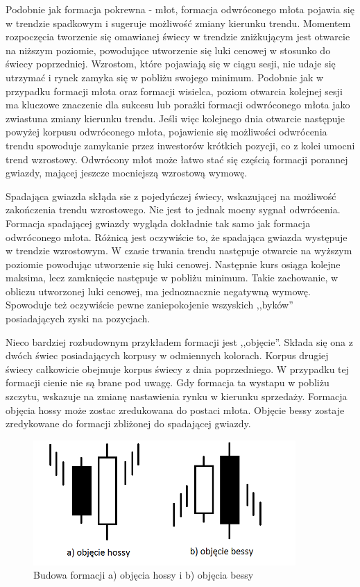 \documentclass[pdflatex,11pt]{aghdpl}
\begin{document}
Podobnie jak formacja pokrewna - młot, formacja odwróconego młota pojawia się w trendzie spadkowym i sugeruje możliwość zmiany kierunku trendu. Momentem rozpoczęcia tworzenie się omawianej świecy w trendzie zniżkującym jest otwarcie na niższym poziomie, powodujące utworzenie się luki cenowej w stosunko do świecy poprzedniej. Wzrostom, które pojawiają się w ciągu sesji, nie udaje się utrzymać i rynek zamyka się w pobliżu swojego minimum. Podobnie jak w przypadku formacji młota oraz formacji wisielca, poziom otwarcia kolejnej sesji ma kluczowe znaczenie dla sukcesu lub porażki formacji odwróconego młota jako zwiastuna zmiany kierunku trendu. Jeśli więc kolejnego dnia otwarcie następuje powyżej korpusu odwróconego młota, pojawienie się możliwości odwrócenia trendu spowoduje zamykanie przez inwestorów krótkich pozycji, co z kolei umocni trend wzrostowy. Odwrócony młot może łatwo stać się częścią formacji porannej gwiazdy, mającej jeszcze mocniejszą wzrostową wymowę. 

Spadająca gwiazda skłąda sie z pojedyńczej świecy, wskazującej na możliwość zakończenia trendu wzrostowego. Nie jest to jednak mocny sygnał odwrócenia. Formacja spadającej gwiazdy wygląda dokładnie tak samo jak formacja odwróconego młota. Różnicą jest oczywiście to, że spadająca gwiazda występuje w trendzie wzrostowym. W czasie trwania trendu następuje otwarcie na wyższym poziomie powodując utworzenie się luki cenowej. Następnie kurs osiąga kolejne maksima, lecz zamknięcie następuje w pobliżu minimum. Takie zachowanie, w obliczu utworzonej luki cenowej, ma jednoznacznie negatywną wymowę. Spowoduje też oczywiście pewne zaniepokojenie wszyskich ,,byków'' posiadających zyski na pozycjach. 
 
Nieco bardziej rozbudownym przykładem formacji jest ,,objęcie''. Składa się ona z dwóch świec posiadających korpusy w odmiennych kolorach. Korpus drugiej świecy całkowicie obejmuje korpus świecy z dnia poprzedniego. W przypadku tej formacji cienie nie są brane pod uwagę. Gdy formacja ta wystapu w pobliżu szczytu, wskazuje na zmianę nastawienia rynku w kierunku sprzedaży. Formacja objęcia hossy może zostac zredukowana do postaci młota. Objęcie bessy zostaje zredykowane do formacji zbliżonej do spadającej gwiazdy. 
\begin{figure}[ht]
\begin{center}
\includegraphics[width=10cm]{engulfing.png}
\caption{Budowa formacji a) objęcia hossy i b) objęcia bessy}
\label{objecie}
\end{center}
\end{figure} 
\end{document}
